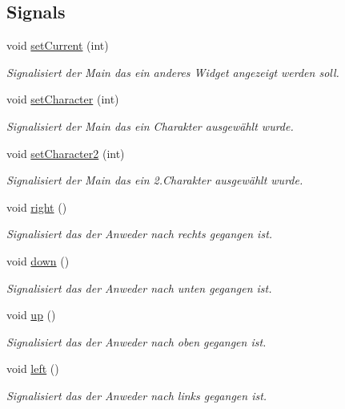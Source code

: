 \subsection*{Signals}
\begin{DoxyCompactItemize}
\item 
void \hyperlink{class_choose_menu_a053dc4e1fccc670fd57940a9143ba70e}{set\+Current} (int)
\begin{DoxyCompactList}\small\item\em Signalisiert der Main das ein anderes Widget angezeigt werden soll. \end{DoxyCompactList}\item 
void \hyperlink{class_choose_menu_a9ddf26dbd1f7e26d80978de6a881ee1b}{set\+Character} (int)
\begin{DoxyCompactList}\small\item\em Signalisiert der Main das ein Charakter ausgewählt wurde. \end{DoxyCompactList}\item 
void \hyperlink{class_choose_menu_af8b98075fd4c7c50ad7417852e8ed226}{set\+Character2} (int)
\begin{DoxyCompactList}\small\item\em Signalisiert der Main das ein 2.\+Charakter ausgewählt wurde. \end{DoxyCompactList}\item 
void \hyperlink{class_choose_menu_ab60b2705eb02edf89244d2f44debd3e7}{right} ()
\begin{DoxyCompactList}\small\item\em Signalisiert das der Anweder nach rechts gegangen ist. \end{DoxyCompactList}\item 
void \hyperlink{class_choose_menu_a667b64a72cbadf598af6eadd27d474de}{down} ()
\begin{DoxyCompactList}\small\item\em Signalisiert das der Anweder nach unten gegangen ist. \end{DoxyCompactList}\item 
void \hyperlink{class_choose_menu_aab43a0cf8d120937626a34f24ba29342}{up} ()
\begin{DoxyCompactList}\small\item\em Signalisiert das der Anweder nach oben gegangen ist. \end{DoxyCompactList}\item 
void \hyperlink{class_choose_menu_a583409f96522df4268a0d3441380b492}{left} ()
\begin{DoxyCompactList}\small\item\em Signalisiert das der Anweder nach links gegangen ist. \end{DoxyCompactList}\end{DoxyCompactItemize}
